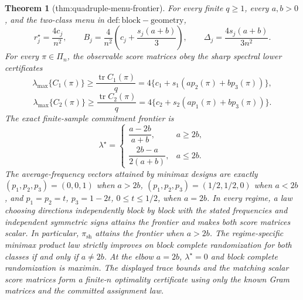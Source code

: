 \documentclass{article}
\newtheorem{theorem}{Theorem}
\begin{document}
\begin{theorem}[thm:quadruple-menu-frontier]\label{thm:quadruple-menu-frontier}
For every finite \(q\ge1\), every \(a,b>0\), and the two-class menu in \(\mathrm{def:block-geometry}\),
\[
r_j^\star=\frac{4c_j}{n^2},\qquad
B_j=\frac{4}{n^2}\left(c_j+\frac{s_j(a+b)}{3}\right),\qquad
\Delta_j=\frac{4s_j(a+b)}{3n^2}.
\]
For every \(\pi\in\Pi_n\), the observable score matrices obey the sharp spectral lower certificates
\[
\lambda_{\max}\{C_1(\pi)\}\ge\frac{\operatorname{tr}C_1(\pi)}q
=4\{c_1+s_1(ap_2(\pi)+bp_3(\pi))\},
\]
\[
\lambda_{\max}\{C_2(\pi)\}\ge\frac{\operatorname{tr}C_2(\pi)}q
=4\{c_2+s_2(ap_1(\pi)+bp_3(\pi))\}.
\]
The exact finite-sample commitment frontier is
\[
\lambda^\star=
\begin{cases}
\dfrac{a-2b}{a+b},&a\ge2b,\\[6pt]
\dfrac{2b-a}{2(a+b)},&a\le2b.
\end{cases}
\]
The average-frequency vectors attained by minimax designs are exactly \((p_1,p_2,p_3)=(0,0,1)\) when \(a>2b\), \((p_1,p_2,p_3)=(1/2,1/2,0)\) when \(a<2b\), and \(p_1=p_2=t\), \(p_3=1-2t\), \(0\le t\le1/2\), when \(a=2b\). In every regime, a law choosing directions independently block by block with the stated frequencies and independent symmetric signs attains the frontier and makes both score matrices scalar. In particular, \(\pi_{\mathrm{sh}}\) attains the frontier when \(a>2b\). The regime-specific minimax product law strictly improves on block complete randomization for both classes if and only if \(a\ne2b\). At the elbow \(a=2b\), \(\lambda^\star=0\) and block complete randomization is maximin. The displayed trace bounds and the matching scalar score matrices form a finite-\(n\) optimality certificate using only the known Gram matrices and the committed assignment law.
\end{theorem}
\end{document}
